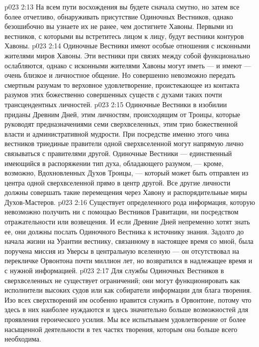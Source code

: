 \vs p023 2:13 \bibnobreakspace {} На всем пути восхождения вы будете сначала смутно, но затем все более отчетливо, обнаруживать присутствие Одиночных Вестников, однако безошибочно вы узнаете их не ранее, чем достигнете Хавоны. Первыми из вестников, с которыми вы встретитесь лицом к лицу, будут вестники контуров Хавоны.
\vs p023 2:14 Одиночные Вестники имеют особые отношения с исконными жителями миров Хавоны. Эти вестники при связях между собой функционально ослабляются, однако с исконными жителями Хавоны могут иметь --- и имеют --- очень близкое и личностное общение. Но совершенно невозможно передать смертным разумам то верховное удовлетворение, проистекающее из контакта разумов этих божественно совершенных существ с духами таких почти трансцендентных личностей.
\vs p023 2:15 \bibnobreakspace {} Одиночные Вестники в изобилии приданы Древним Дней, этим личностям, происходящим от Троицы, которые руководят предназначениями семи сверхвселенных, этим трио божественной власти и административной мудрости. При посредстве именно этого чина вестников триединые правители одной сверхвселенной могут напрямую лично связываться с правителями другой. Одиночные Вестники --- единственный имеющийся в распоряжении тип духа, обладающего разумом, --- кроме, возможно, Вдохновленных Духов Троицы, --- который может быть отправлен из центра одной сверхвселенной прямо в центр другой. Все другие личности должны совершать такие перемещения через Хавону и распорядительные миры Духов\hyp{}Мастеров.
\vs p023 2:16 Существует определенного рода информация, которую невозможно получить ни с помощью Вестников Гравитации, ни посредством отражательности или возвещения. И если Древние Дней непременно хотят знать ее, они должны послать Одиночного Вестника к источнику знания. Задолго до начала жизни на Урантии вестнику, связанному в настоящее время со мной, была поручена миссия из Уверсы в центральную вселенную --- он отсутствовал на перекличке Орвонтона почти миллион лет, но возвратился в надлежащее время и с нужной информацией.
\vs p023 2:17 Для службы Одиночных Вестников в сверхвселенных не существует ограничений; они могут функционировать как исполнители высоких судов или как собиратели информации для блага творения. Изо всех сверхтворений им особенно нравится служить в Орвонтоне, потому что здесь в них наиболее нуждаются и здесь значительно больше возможностей для проявления героического усилия. Мы все испытываем удовлетворение от более насыщенной деятельности в тех частях творения, которым она больше всего необходима.
